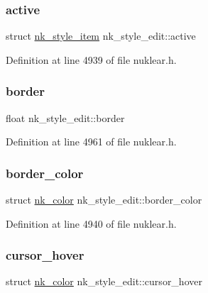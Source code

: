 \subsubsection{\texorpdfstring{active}{active}}
{\footnotesize\ttfamily struct \mbox{\hyperlink{structnk__style__item}{nk\+\_\+style\+\_\+item}} nk\+\_\+style\+\_\+edit\+::active}



Definition at line 4939 of file nuklear.\+h.

\mbox{\label{structnk__style__edit_a71cb11fe699fb87987b668da7ad09106}} 
\subsubsection{\texorpdfstring{border}{border}}
{\footnotesize\ttfamily float nk\+\_\+style\+\_\+edit\+::border}



Definition at line 4961 of file nuklear.\+h.

\mbox{\label{structnk__style__edit_a7db1be8d08fe0819c01573f30fd76dc4}} 
\subsubsection{\texorpdfstring{border\+\_\+color}{border\_color}}
{\footnotesize\ttfamily struct \mbox{\hyperlink{structnk__color}{nk\+\_\+color}} nk\+\_\+style\+\_\+edit\+::border\+\_\+color}



Definition at line 4940 of file nuklear.\+h.

\mbox{\label{structnk__style__edit_aa204d0ab634e2a3d1c36497a847fbb0e}} 
\subsubsection{\texorpdfstring{cursor\+\_\+hover}{cursor\_hover}}
{\footnotesize\ttfamily struct \mbox{\hyperlink{structnk__color}{nk\+\_\+color}} nk\+\_\+style\+\_\+edit\+::cursor\+\_\+hover}



